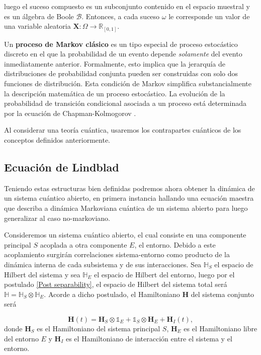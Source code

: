 \documentclass{report} %
\numberwithin{equation}{section}
\begin{document}
\noindent luego el suceso compuesto es un subconjunto contenido en el espacio muestral y es un álgebra de Boole $\mathcal{B}$. Entonces, a cada suceso $\omega$ le corresponde un valor de una variable aleatoria $\mathbf{X}: \Omega \rightarrow \mathds{R}_{[0,1]}$.

Un \textbf{proceso de Markov clásico} es un tipo especial de proceso estocástico discreto en el que la probabilidad de un evento depende \textit{solamente} del evento inmediatamente anterior. Formalmente, esto implica que la jerarquía de distribuciones de probabilidad conjunta pueden ser construidas con solo dos funciones de distribución. Esta condición de Markov simplifica substancialmente la descripción matemática de un proceso estocástico.  La evolución de la probabilidad de transición condicional asociada a un proceso está determinada por la ecuación de Chapman-Kolmogorov \cite{HeinzPetruccione, Dynkin89}.

Al considerar una teoría cuántica, usaremos los contrapartes cuánticos de los conceptos definidos anteriormente.

\subsection*{Ecuación de Lindblad} 

Teniendo estas estructuras bien definidas podremos ahora obtener la dinámica de un sistema cuántico abierto, en primera instancia hallando una ecuación maestra que describa a dinámica Markoviana cuántica de un sistema abierto para luego generalizar al caso no-markoviano. 
 
Consideremos un sistema cuántico abierto, el cual consiste en una componente principal $S$ acoplada a otra componente $E$, el entorno. Debido a este acoplamiento surgirán correlaciones sistema-entorno como producto de la dinámica interna de cada subsistema y de sus interacciones.
Sea $\mathbb{H}_S$ el espacio de Hilbert del sistema y sea $\mathbb{H}_E$ el espacio de Hilbert del entorno, luego por el postulado \ref{Post separability}, el espacio de Hilbert del sistema total será $\mathbb{H} = \mathbb{H}_S \otimes \mathbb{H}_E$. Acorde a dicho postulado, el Hamiltoniano $\mathbf{H}$ del sistema conjunto será 

\begin{equation}
\mathbf{H}(t)= \mathbf{H}_S \otimes \mathds{1}_E + \mathds{1}_S \otimes \mathbf{H}_E + \mathbf{H}_I (t),
\end{equation}
donde $\mathbf{H}_S$ es el Hamiltoniano del sistema principal $S$, $\mathbf{H}_E$ es el Hamiltoniano libre del entorno $E$ y $\mathbf{H}_I$ es el Hamiltoniano de interacción entre el sistema y el entorno. 
\end{document}

